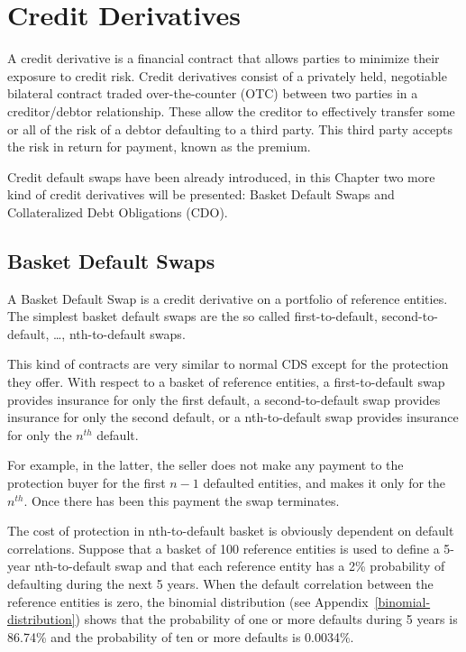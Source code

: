 \chapter{Credit Derivatives}

A credit derivative is a financial contract that allows parties to minimize their exposure to credit risk. Credit derivatives consist of a privately held, negotiable bilateral contract traded over-the-counter (OTC) between two parties in a creditor/debtor relationship. These allow the creditor to effectively transfer some or all of the risk of a debtor defaulting to a third party. This third party accepts the risk in return for payment, known as the premium.

Credit default swaps have been already introduced, in this Chapter two more kind of credit derivatives will be presented: Basket Default Swaps and Collateralized Debt Obligations (CDO).

\section{Basket Default Swaps}\label{basket-default-swaps}

A Basket Default Swap is a credit derivative on a portfolio of reference entities. The simplest basket default swaps are the so called first-to-default, second-to-default, \ldots, nth-to-default swaps. 

This kind of contracts are very similar to normal CDS except for the protection they offer. With respect to a basket of reference entities, a first-to-default swap provides insurance for only the first default, a second-to-default swap provides insurance for only the second default, or a nth-to-default swap provides insurance for only the $n^{th}$ default. 

For example, in the latter, the seller does not make any payment to the protection buyer for the first $n-1$ defaulted entities, and makes it only for the $n^{th}$. Once there has been this payment the swap terminates.

The cost of protection in nth-to-default basket is obviously dependent on default correlations. Suppose that a basket of 100 reference entities is used to define a 5-year nth-to-default swap and that each reference entity has a 2\% probability of defaulting during the next 5 years. When the default correlation between the reference entities is zero, the binomial distribution (see Appendix~\ref{binomial-distribution}) shows that the probability of one or more defaults during 5 years is 86.74\% and the probability of ten or more defaults is 0.0034\%.

